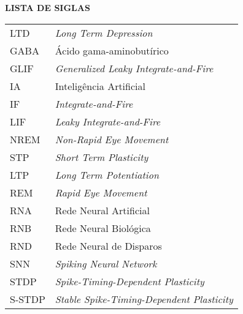 \begin{center}
\textbf{LISTA DE SIGLAS}
\end{center}
\vspace*{0.5cm}
\begin{tabular}{ll}
LTD & \textit{Long Term Depression} \\
GABA & Ácido gama-aminobutírico \\
GLIF & \textit{Generalized Leaky Integrate-and-Fire} \\
IA & Inteligência Artificial \\
IF & \textit{Integrate-and-Fire} \\
LIF & \textit{Leaky Integrate-and-Fire} \\
NREM & \textit{Non-Rapid Eye Movement} \\
STP & \textit{Short Term Plasticity} \\
LTP & \textit{Long Term Potentiation} \\
REM & \textit{Rapid Eye Movement} \\
RNA & Rede Neural Artificial \\
RNB & Rede Neural Biológica \\
RND & Rede Neural de Disparos \\
SNN & \textit{Spiking Neural Network} \\
STDP & \textit{Spike-Timing-Dependent Plasticity } \\
S-STDP & \textit{Stable Spike-Timing-Dependent Plasticity } \\

\end{tabular}
\addtocounter{table}{0}